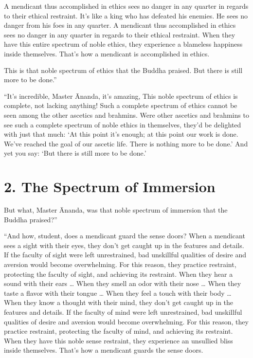 \documentclass[12pt,openany]{book}%
\begin{document}
A mendicant thus accomplished in ethics sees no danger in any quarter in regards to their ethical restraint. It’s like a king who has defeated his enemies. He sees no danger from his foes in any quarter. A mendicant thus accomplished in ethics sees no danger in any quarter in regards to their ethical restraint. When they have this entire spectrum of noble ethics, they experience a blameless happiness inside themselves. That’s how a mendicant is accomplished in ethics. 

This is that noble spectrum of ethics that the Buddha praised. But there is still more to be done.” 

“It’s incredible, Master Ānanda, it’s amazing, This noble spectrum of ethics is complete, not lacking anything! Such a complete spectrum of ethics cannot be seen among the other ascetics and brahmins. Were other ascetics and brahmins to see such a complete spectrum of noble ethics in themselves, they’d be delighted with just that much: ‘At this point it’s enough; at this point our work is done. We’ve reached the goal of our ascetic life. There is nothing more to be done.’ And yet you say: ‘But there is still more to be done.’ 

\section*{2. The Spectrum of Immersion }

But what, Master Ānanda, was that noble spectrum of immersion that the Buddha praised?” 

“And how, student, does a mendicant guard the sense doors? When a mendicant sees a sight with their eyes, they don’t get caught up in the features and details. If the faculty of sight were left unrestrained, bad unskillful qualities of desire and aversion would become overwhelming. For this reason, they practice restraint, protecting the faculty of sight, and achieving its restraint. When they hear a sound with their ears … When they smell an odor with their nose … When they taste a flavor with their tongue … When they feel a touch with their body … When they know a thought with their mind, they don’t get caught up in the features and details. If the faculty of mind were left unrestrained, bad unskillful qualities of desire and aversion would become overwhelming. For this reason, they practice restraint, protecting the faculty of mind, and achieving its restraint. When they have this noble sense restraint, they experience an unsullied bliss inside themselves. That’s how a mendicant guards the sense doors. 
\end{document}
